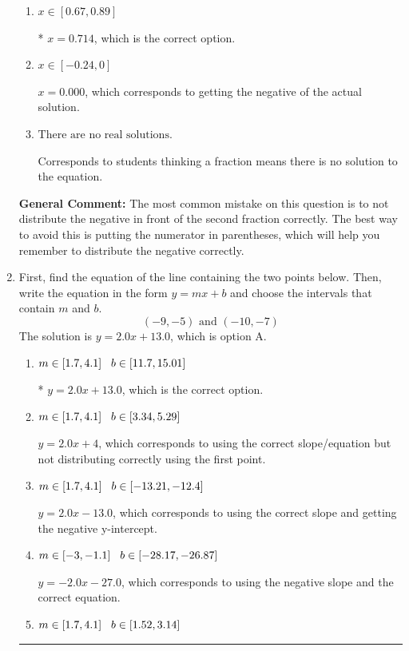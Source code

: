 \documentclass{extbook}[14pt]
\newcommand{\litem}[1]{\item #1

\rule{\textwidth}{0.4pt}}
\begin{document}
\begin{enumerate}
{\begin{enumerate}[label=\Alph*.]
$x = 0.429$, which corresponds to not distributing the negative in front of the first parentheses correctly.
\item \( x \in [0.67, 0.89] \)

* $x = 0.714$, which is the correct option.
\item \( x \in [-0.24, 0] \)

$x = 0.000$, which corresponds to getting the negative of the actual solution.
\item \( \text{There are no real solutions.} \)

Corresponds to students thinking a fraction means there is no solution to the equation.
\end{enumerate}

\textbf{General Comment:} The most common mistake on this question is to not distribute the negative in front of the second fraction correctly. The best way to avoid this is putting the numerator in parentheses, which will help you remember to distribute the negative correctly.
}
\litem{
First, find the equation of the line containing the two points below. Then, write the equation in the form $ y=mx+b $ and choose the intervals that contain $m$ and $b$.
\[ (-9, -5) \text{ and } (-10, -7) \]The solution is \( y = 2.0x + 13.0 \), which is option A.\begin{enumerate}[label=\Alph*.]
\item \( m \in [1.7, 4.1] \hspace*{3mm} b \in [11.7, 15.01] \)

* $y = 2.0x + 13.0$, which is the correct option.
\item \( m \in [1.7, 4.1] \hspace*{3mm} b \in [3.34, 5.29] \)

 $y = 2.0x + 4$, which corresponds to using the correct slope/equation but not distributing correctly using the first point.
\item \( m \in [1.7, 4.1] \hspace*{3mm} b \in [-13.21, -12.4] \)

 $y = 2.0x -13.0$, which corresponds to using the correct slope and getting the negative y-intercept.
\item \( m \in [-3, -1.1] \hspace*{3mm} b \in [-28.17, -26.87] \)

 $y = -2.0x -27.0$, which corresponds to using the negative slope and the correct equation.
\item \( m \in [1.7, 4.1] \hspace*{3mm} b \in [1.52, 3.14] \)


\end{enumerate}}
\end{enumerate}
\end{document}
